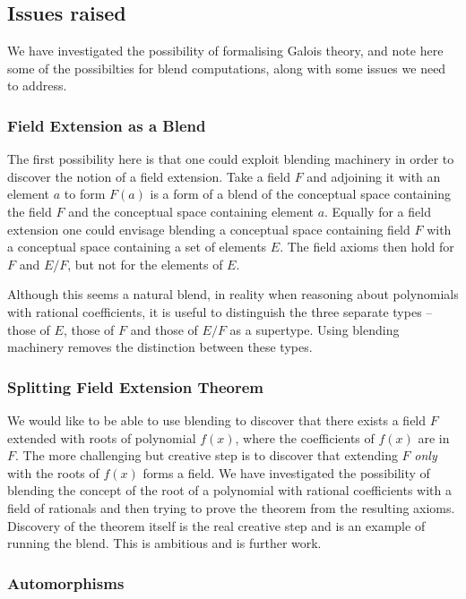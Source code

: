 \subsection{Issues raised}

We have investigated the possibility of formalising Galois theory, and
note here some of the possibilties for blend computations, along with
some issues we need to address.

\subsubsection{Field Extension as a Blend}

The first possibility here is that one could exploit blending
machinery in order to discover the notion of a field extension. Take a
field $F$ and adjoining it with an element $a$ to form $F(a)$ is a
form of a blend of the conceptual space containing the field $F$ and
the conceptual space containing element $a$. Equally for a field
extension one could envisage blending a conceptual space containing
field $F$ with a conceptual space containing a set of elements
$E$. The field axioms then hold for $F$ and $E/F$, but not for the
elements of $E$.

Although this seems a natural blend, in reality when reasoning about
polynomials with rational coefficients, it is useful to distinguish
the three separate types -- those of $E$, those of $F$ and those of
$E/F$ as a supertype. Using blending machinery removes the distinction
between these types.

\subsubsection{Splitting Field Extension Theorem}

We would like to be able to use blending to discover that there exists a
field $F$ extended with roots of polynomial $f(x)$, where the coefficients of $f(x)$ are in $F$. The more challenging but creative step is to discover that extending $F$ {\em only} with the roots of $f(x)$ forms a field. We have investigated the possibility of blending the concept of the root of a polynomial with rational coefficients with a field of rationals and then trying to prove the theorem from the resulting axioms. Discovery of the theorem itself is the real creative step and is an example of running the blend. This is ambitious and is further work.

\subsubsection{Automorphisms}

